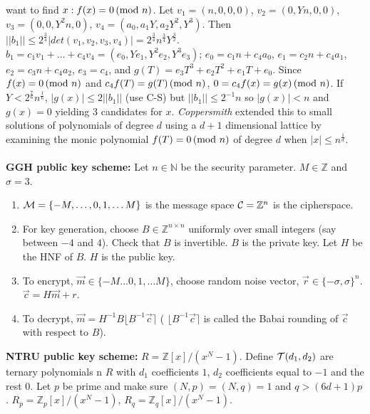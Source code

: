 want to find $x: f(x)=0 \thinspace \textnormal{(mod } n \textnormal{)}$.  Let
$v_1= (n, 0, 0, 0)$, $v_2= (0, Yn, 0, 0)$, $v_3= (0, 0, Y^2n, 0)$,
$v_4= (a_0 , a_1 Y, a_2Y^2, Y^3)$.  Then 
$||b_1|| \le 
2^{\frac 3 4} |det(v_1, v_2, v_3, v_4)| = 2^{\frac 3 4}n^{\frac 3 4} Y^{\frac 3 2}$.
$b_1= c_1 v_1 + \ldots + c_4 v_4= (e_0 , Y e_1 , Y^2 e_2, Y^3 e_3)$;
$e_0 = c_1 n + c_4 a_0$, $e_1 = c_2 n + c_4 a_1$,
$e_2 = c_3 n + c_4 a_2$,
$e_3 =  c_4$, and $g(T)= e_3 T^3 + e_2 T^2  + e_1 T +e_0$.  Since $f(x)= 0 \thinspace \textnormal{(mod } n \textnormal{)}$
and $c_4 f(T)= g(T) \thinspace \textnormal{(mod } n \textnormal{)}$, $0=c_4 f(x) = g(x) \thinspace \textnormal{(mod } n \textnormal{)}$.  If
$Y < 2^{\frac 7 6} n^{\frac 1 6}$, $|g(x)| \le 2 || b_1 ||$ (use C-S) but
$||b_1|| \le 2^{-1} n$ so $|g(x)| < n$ and $g(x)=0$ yielding 3 candidates for $x$.
\emph{Coppersmith} extended this to small solutions of polynomials of degree $d$ using
a $d+1$ dimensional lattice by examining the monic polynomial $f(T)= 0 \thinspace \textnormal{(mod } n \textnormal{)}$ of
degree $d$ when $|x| \le n^{\frac 1 d}$.
\\
\\
{\bf GGH public key scheme: }
Let $n \in {\mathbb N}$ be the security parameter. $M \in {\mathbb Z}$ and $\sigma = 3$.
\begin{enumerate}
\item ${\cal M} = \{ -M, \ldots , 0, 1, \ldots M\}$ is the message space ${\cal C} = {\mathbb Z}^n$ is the cipherspace.
\item For key generation, choose $B \in {\mathbb Z}^{n \times n}$ uniformly over small integers (say between $-4$ and
$4$).  Check that $B$ is invertible.  $B$ is the private key.  Let $H$ be the HNF of $B$.  $H$ is the public key.
\item To encrypt, ${\vec m} \in \{ -M \ldots 0, 1, \ldots M\}$,
choose random noise vector, ${\vec r} \in \{ -\sigma, \sigma \}^n$.  ${\vec c} = H{\vec m} + r$.
\item To decrypt, ${\vec m} = H^{-1} B \lfloor B^{-1} {\vec c}\rceil$ ( $ \lfloor B^{-1} {\vec c} \rceil$ is
called the Babai rounding of ${\vec c}$ with respect to  $B$).
\end{enumerate}
{\bf NTRU public key scheme: }
$R = {\mathbb Z}[x]/(x^N-1)$.  Define ${\cal T}(d_1, d_2)$ are ternary polynomials n $R$
with $d_1$ coefficients $1$, $d_2$ coefficients
equal to $-1$ and the rest $0$.  Let $p$ be prime and make sure $(N,p)=(N,q)=1$ and $q > (6d+1)p$.
$R_p = {\mathbb Z}_p[x]/(x^N-1)$, $R_q = {\mathbb Z}_q[x]/(x^N-1)$.
